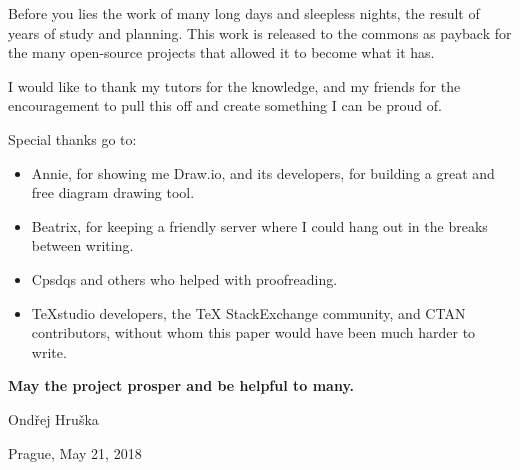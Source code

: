 \begin{thanks}

Before you lies the work of many long days and sleepless nights, the result of years of study and planning. This work is released to the commons as payback for the many open-source projects that allowed it to become what it has.

\vspace{5pt}
I would like to thank my tutors for the knowledge, and my friends for the encouragement to pull this off and create something I can be proud of. 

\vspace{15pt}
\noindent
Special thanks go to:

\vspace{-5pt}
\begin{itemize}
\item Annie, for showing me Draw.io, and its developers, for building a great and free diagram drawing tool.
\item Beatrix, for keeping a friendly server where I could hang out in the breaks between writing.
\item Cpsdqs and others who helped with proofreading.
\item TeXstudio developers, the TeX StackExchange community, and CTAN contributors, without whom this paper would have been much harder to write.
\end{itemize}

\vspace{5pt}
\noindent
\textbf{May the project prosper and be helpful to many.}

\vspace{25pt}
\noindent
Ondřej Hruška

\noindent
Prague, May 21, 2018

\end{thanks}
